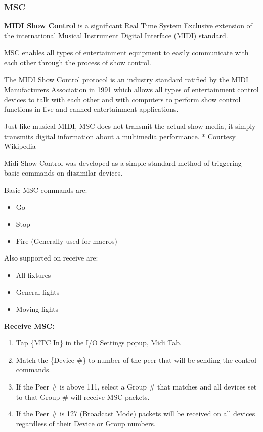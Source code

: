 \documentclass[
]{article}
\begin{document}
\hypertarget{msc}{%
\subsubsection{MSC}\label{msc}}

\textbf{MIDI Show Control} is a significant Real Time System Exclusive extension of the international Musical Instrument Digital Interface (MIDI) standard.

MSC enables all types of entertainment equipment to easily communicate with each other through the process of show control.

The MIDI Show Control protocol is an industry standard ratified by the MIDI Manufacturers Association in 1991 which allows all types of entertainment control devices to talk with each other and with computers to perform show control functions in live and canned entertainment applications.

Just like musical MIDI, MSC does not transmit the actual show media, it simply transmits digital information about a multimedia performance. * Courtesy Wikipedia

Midi Show Control was developed as a simple standard method of triggering basic commands on dissimilar devices.

Basic MSC commands are:

\begin{itemize}
\item
  Go
\item
  Stop
\item
  Fire (Generally used for macros)
\end{itemize}

Also supported on receive are:

\begin{itemize}
\item
  All fixtures
\item
  General lights
\item
  Moving lights
\end{itemize}

\textbf{Receive MSC:}

\begin{enumerate}
\def\labelenumi{\arabic{enumi}.}
\item
  Tap \{MTC In\} in the I/O Settings popup, Midi Tab.
\item
  Match the \{Device \#\} to number of the peer that will be sending the control commands.
\item
  If the Peer \# is above 111, select a Group \# that matches and all devices set to that Group \# will receive MSC packets.
\item
  If the Peer \# is 127 (Broadcast Mode) packets will be received on all devices regardless of their Device or Group numbers.
\end{enumerate}
\end{document}
